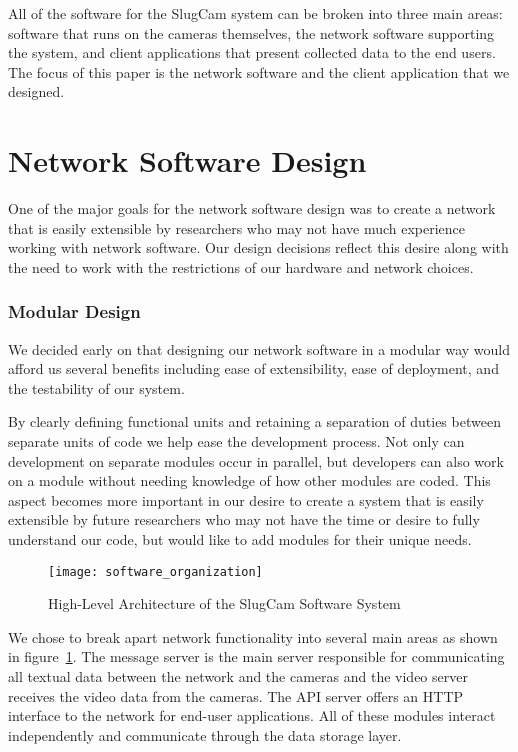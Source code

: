 All of the software for the SlugCam system can be broken into three main areas:
software that runs on the cameras themselves, the network software supporting
the system, and client applications that present collected data to the end
users. The focus of this paper is the network software and the client
application that we designed.

\section{Network Software Design}

One of the major goals for the network software design was to create a
network that is easily extensible by researchers who may not have much
experience working with network software. Our design decisions reflect this
desire along with the need to work with the restrictions of our hardware and
network choices.

\subsubsection{Modular Design}

We decided early on that designing our network software in a modular way would
afford us several benefits including ease of extensibility, ease of deployment,
and the testability of our system.

By clearly defining functional units and retaining a separation of duties
between separate units of code we help ease the development process. Not only
can development on separate modules occur in parallel, but developers can also
work on a module without needing knowledge of how other modules are coded. This
aspect becomes more important in our desire to create a system that is easily
extensible by future researchers who may not have the time or desire to fully
understand our code, but would like to add modules for their unique needs.

\begin{figure}[!t]
\centering
\texttt{[image: software\_organization]}
\caption{High-Level Architecture of the SlugCam Software System}
\label{fig_netoverview}
\end{figure}

We chose to break apart network functionality into several main areas as shown
in figure~\ref{fig_netoverview}. The message server is the main server
responsible for communicating all textual data between the network and the
cameras and the video server receives the video data from the cameras. The API
server offers an HTTP interface to the network for end-user applications. All of
these modules interact independently and communicate through the data storage
layer. 

